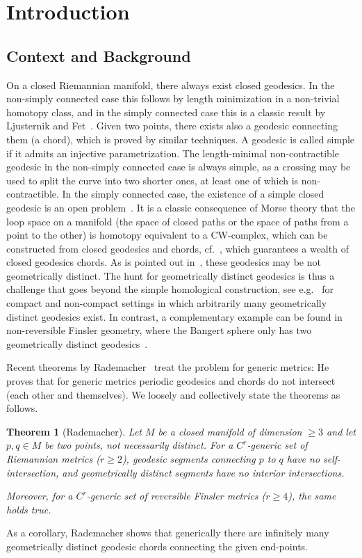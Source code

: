 \documentclass{amsart}
\newtheorem*{theorem*}{Theorem}
\theoremstyle{definition}
\theoremstyle{remark}
\numberwithin{equation}{section}
\begin{document}
\section{Introduction}\label{sec:intro}


\subsection{Context and Background}
On a closed Riemannian manifold, there always exist closed geodesics. In the non-simply connected case this follows by length minimization in a non-trivial homotopy class, and in the simply connected case this is a classic result by Ljusternik and Fet~\cite{LF}. Given two points, there exists also a geodesic connecting them (a chord), which is proved by similar techniques. A geodesic is called simple if it admits an injective parametrization. The length-minimal non-contractible geodesic in the non-simply connected case is always simple, as a crossing may be used to split the curve into two shorter ones, at least one of which is non-contractible. In the simply connected case, the existence of a simple closed geodesic is an open problem~\cite{AHS}. It is a classic consequence of Morse theory that the loop space on a manifold (the space of closed paths or the space of paths from a point to the other) is homotopy equivalent to a CW-complex, which can be constructed from closed geodesics and chords, cf.~\cite{M}, which guarantees a wealth of closed geodesics chords. As is pointed out in~\cite[Problem C]{T}, these geodesics may be not geometrically distinct. The hunt for geometrically distinct geodesics is thus a challenge that goes beyond the simple homological construction, see e.g.~\cite{Franks, CM24, AM} for compact and non-compact settings in which arbitrarily many geometrically distinct geodesics exist. In contrast, a complementary example can be found in non-reversible Finsler geometry, where the Bangert sphere only has two geometrically distinct geodesics~\cite{B}.

Recent theorems by Rademacher~\cite{R23,R24} treat the problem for generic metrics: He proves that for generic metrics periodic geodesics and chords do not intersect (each other and themselves). We loosely and collectively state the theorems as follows.
\begin{theorem*}[Rademacher]
    Let $M$ be a closed manifold of dimension $\geq 3$ and let $p,q\in M$ be two points, not necessarily distinct. For a $C^r$-generic set of Riemannian metrics ($r\geq 2$), geodesic segments connecting $p$ to $q$ have no self-intersection, and geometrically distinct segments have no interior intersections. 

    Moreover, for a $C^r$-generic set of reversible Finsler metrics ($r\geq 4$), the same holds true.
\end{theorem*}
As a corollary, Rademacher shows \cite[Corollary 1]{R24} that generically there are infinitely many geometrically distinct geodesic chords connecting the given end-points.
\end{document}
